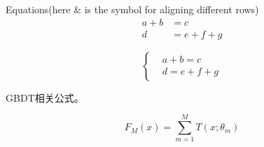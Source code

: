 \documentclass[UTF8]{ctexart}
\begin{document}
Equations(here \& is the symbol for aligning different rows)
\begin{align}
    a+b & =c     \\
    d   & =e+f+g
\end{align}

\[
    \left\{
    \begin{aligned}
         & a+b=c   \\
         & d=e+f+g
    \end{aligned}
    \right.
\]

GBDT相关公式。

\begin{equation}
    F_M(x)=\sum_{m=1}^{M} T(x; \theta_m)
\end{equation}
\end{document}

